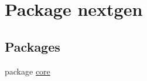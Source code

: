 \hypertarget{namespacenextgen}{\section{Package nextgen}
\label{namespacenextgen}
}
\subsection*{Packages}
\begin{DoxyCompactItemize}
\item 
package \hyperlink{namespacenextgen_1_1core}{core}
\end{DoxyCompactItemize}
